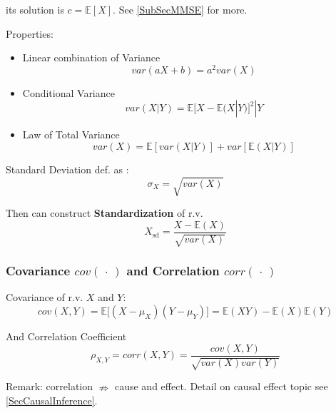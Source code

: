     its solution is $ c=\mathbb{E}\left[ X \right]  $. See \autoref{SubSecMMSE} for more.

\begin{point}
    Properties:
\end{point}

\begin{itemize} 
    \item Linear combination of Variance\begin{equation}
        var(aX+b)=a^2var(X)
    \end{equation}
    \item Conditional Variance
    \begin{equation}
        var(X|Y)=\mathbb{E}{[X-\mathbb{E}(X|Y)]^2|Y}
    \end{equation}
    \item Law of Total Variance\begin{equation}
        var(X)=\mathbb{E}[var(X|Y)]+var[\mathbb{E}(X|Y)]
    \end{equation}
\end{itemize}

    Standard Deviation def. as :
    \begin{equation}\sigma_X=\sqrt{var(X)}\end{equation}

    Then can construct \textbf{Standardization} of r.v.
    \begin{equation}X_\mathrm{sd} =\frac{X-\mathbb{E}(X)}{\sqrt{var(X)}}\end{equation}


\subsubsection{Covariance $ cov(\, \cdot \, ) $ and Correlation $ corr(\, \cdot \, ) $}\label{SubSubSectionCovarianceAndCorrelation}
    Covariance of r.v. $X$ and $Y$:\begin{equation}
        cov(X,Y)=\mathbb{E}\big[(X-\mu_X)(Y-\mu_Y)\big]=\mathbb{E}(XY)-\mathbb{E}(X)\mathbb{E}(Y)
    \end{equation}

    And Correlation Coefficient
    \begin{equation}
        \rho_{X,Y}=corr(X,Y)=\frac{cov(X,Y)}{\sqrt{var(X)var(Y)}}
    \end{equation}

    Remark: correlation $\nRightarrow$ cause and effect. 
    Detail on causal effect topic see \autoref{SecCausalInference}.

